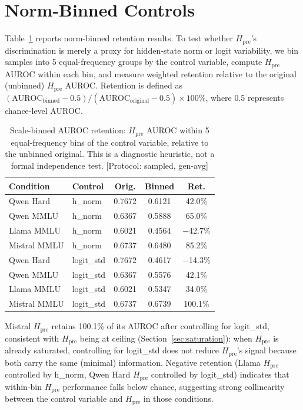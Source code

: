 \documentclass{ieeeaccess}
\newcommand{\Hpre}{H_{\text{pre}}}
\begin{document}
\section{Norm-Binned Controls}
\label{app:normbinned}

Table~\ref{tab:normbinned_hnorm} reports norm-binned retention results. To test whether $\Hpre$'s discrimination is merely a proxy for hidden-state norm or logit variability, we bin samples into 5 equal-frequency groups by the control variable, compute $\Hpre$ AUROC within each bin, and measure weighted retention relative to the original (unbinned) $\Hpre$ AUROC. Retention is defined as $(\text{AUROC}_{\text{binned}} - 0.5) / (\text{AUROC}_{\text{original}} - 0.5) \times 100\%$, where 0.5 represents chance-level AUROC.

\begin{table}[!ht]
\centering
\caption{Scale-binned AUROC retention: $\Hpre$ AUROC within 5 equal-frequency bins of the control variable, relative to the unbinned original. This is a diagnostic heuristic, not a formal independence test. [Protocol: sampled, gen-avg]}
\label{tab:normbinned_hnorm}
\footnotesize
\setlength{\tabcolsep}{3pt}
\begin{tabular}{l l ccc}
\toprule
Condition & Control & Orig. & Binned & Ret. \\
\midrule
Qwen Hard & h\_norm & 0.7672 & 0.6121 & 42.0\% \\
Qwen MMLU & h\_norm & 0.6367 & 0.5888 & 65.0\% \\
Llama MMLU & h\_norm & 0.6021 & 0.4564 & $-$42.7\% \\
Mistral MMLU & h\_norm & 0.6737 & 0.6480 & 85.2\% \\
\midrule
Qwen Hard & logit\_std & 0.7672 & 0.4617 & $-$14.3\% \\
Qwen MMLU & logit\_std & 0.6367 & 0.5576 & 42.1\% \\
Llama MMLU & logit\_std & 0.6021 & 0.5347 & 34.0\% \\
Mistral MMLU & logit\_std & 0.6737 & 0.6739 & 100.1\% \\
\bottomrule
\end{tabular}
\end{table}

Mistral $\Hpre$ retains 100.1\% of its AUROC after controlling for logit\_std, consistent with $\Hpre$ being at ceiling (Section~\ref{sec:saturation}): when $\Hpre$ is already saturated, controlling for logit\_std does not reduce $\Hpre$'s signal because both carry the same (minimal) information. Negative retention (Llama $\Hpre$ controlled by h\_norm, Qwen Hard $\Hpre$ controlled by logit\_std) indicates that within-bin $\Hpre$ performance falls below chance, suggesting strong collinearity between the control variable and $\Hpre$ in those conditions.
\end{document}
